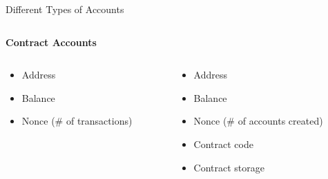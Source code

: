 \documentclass[handout]{beamer}
\begin{document}
\begin{frame}{Different Types of Accounts}
\begin{columns}[T]
\begin{column}{0.45\textwidth}
			\textbf{Contract Accounts}
		\end{column}
	\end{columns}  
\vspace{1em}
	\begin{columns}[T]
		\begin{column}{0.45\textwidth}
			\begin{itemize}
				\item Address
				\item Balance
				\item Nonce (\# of transactions)
			\end{itemize}
		\end{column}
		\begin{column}{0.45\textwidth}
			\begin{itemize}
				\item Address
				\item Balance
				\item Nonce (\# of accounts created)
				\item Contract code
				\item Contract storage
			\end{itemize}
		\end{column}
	\end{columns}
\vspace{1em}
\end{frame}
\end{document}
